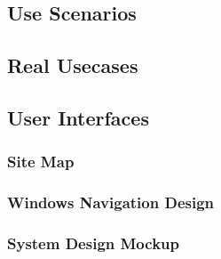 \chapter{\babSembilan}


\section{Use Scenarios}

\section{Real Usecases}

\section{User Interfaces}

\subsection{Site Map}

\subsection{Windows Navigation Design}

\subsection{System Design Mockup}




